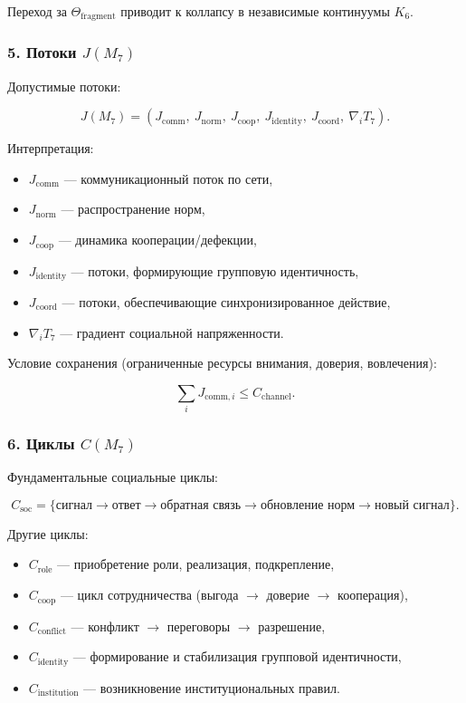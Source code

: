Переход за $\Theta_{\mathrm{fragment}}$ приводит к коллапсу в независимые континуумы $K_6$.

\subsubsection*{5. Потоки \texorpdfstring{$J(M_7)$}{J(M_7)}}

Допустимые потоки:

\[
J(M_7)=
\left(
J_{\mathrm{comm}},\
J_{\mathrm{norm}},\
J_{\mathrm{coop}},\
J_{\mathrm{identity}},\
J_{\mathrm{coord}},\
\nabla_i T_7
\right).
\]

Интерпретация:

\begin{itemize}
    \item $J_{\mathrm{comm}}$ — коммуникационный поток по сети,
    \item $J_{\mathrm{norm}}$ — распространение норм,
    \item $J_{\mathrm{coop}}$ — динамика кооперации/дефекции,
    \item $J_{\mathrm{identity}}$ — потоки, формирующие групповую идентичность,
    \item $J_{\mathrm{coord}}$ — потоки, обеспечивающие синхронизированное действие,
    \item $\nabla_i T_7$ — градиент социальной напряженности.
\end{itemize}

Условие сохранения (ограниченные ресурсы внимания, доверия, вовлечения):

\[
\sum_i J_{\mathrm{comm},i} \le C_{\mathrm{channel}}.
\]

\subsubsection*{6. Циклы \texorpdfstring{$C(M_7)$}{C(M_7)}}

Фундаментальные социальные циклы:

\[
C_{\mathrm{soc}} =
\{
\text{сигнал} \to \text{ответ} \to \text{обратная связь} \to
\text{обновление норм} \to \text{новый сигнал}
\}.
\]

Другие циклы:

\begin{itemize}
    \item $C_{\mathrm{role}}$ — приобретение роли, реализация, подкрепление,
    \item $C_{\mathrm{coop}}$ — цикл сотрудничества (выгода $\to$ доверие $\to$ кооперация),
    \item $C_{\mathrm{conflict}}$ — конфликт $\to$ переговоры $\to$ разрешение,
    \item $C_{\mathrm{identity}}$ — формирование и стабилизация групповой идентичности,
    \item $C_{\mathrm{institution}}$ — возникновение институциональных правил.
\end{itemize}

